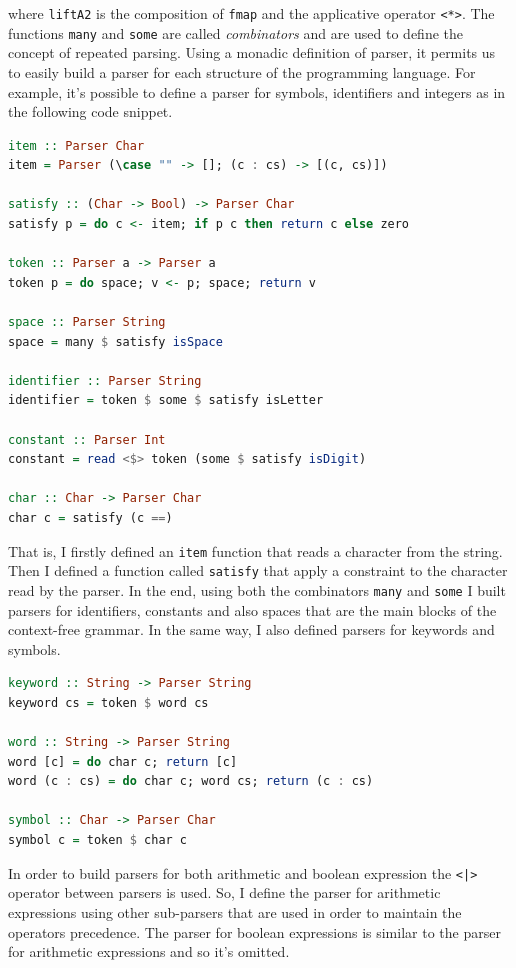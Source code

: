 \documentclass[12pt,a4paper]{article}
\begin{document}
where \texttt{liftA2} is the composition of \texttt{fmap} and the applicative operator \texttt{<*>}.
The functions \texttt{many} and \texttt{some} are called \textit{combinators} and are used to define the concept of repeated parsing.
Using a monadic definition of parser, it permits us to easily build a parser for each structure of the programming language.
For example, it's possible to define a parser for symbols, identifiers and integers as in the following code snippet.
\begin{lstlisting}[language=Haskell, style=custom-style]
item :: Parser Char
item = Parser (\case "" -> []; (c : cs) -> [(c, cs)])

satisfy :: (Char -> Bool) -> Parser Char
satisfy p = do c <- item; if p c then return c else zero

token :: Parser a -> Parser a
token p = do space; v <- p; space; return v

space :: Parser String
space = many $ satisfy isSpace

identifier :: Parser String
identifier = token $ some $ satisfy isLetter

constant :: Parser Int
constant = read <$> token (some $ satisfy isDigit)

char :: Char -> Parser Char
char c = satisfy (c ==)
\end{lstlisting}
That is, I firstly defined an \texttt{item} function that reads a character from the string.
Then I defined a function called \texttt{satisfy} that apply a constraint to the character read by the parser.
In the end, using both the combinators \texttt{many} and \texttt{some} I built parsers for identifiers, constants and also spaces that are the main blocks of the context-free grammar.
In the same way, I also defined parsers for keywords and symbols.
\begin{lstlisting}[language=Haskell, style=custom-style]
keyword :: String -> Parser String
keyword cs = token $ word cs

word :: String -> Parser String
word [c] = do char c; return [c]
word (c : cs) = do char c; word cs; return (c : cs)

symbol :: Char -> Parser Char
symbol c = token $ char c
\end{lstlisting}
In order to build parsers for both arithmetic and boolean expression the \texttt{<|>} operator between parsers is used.
So, I define the parser for arithmetic expressions using other sub-parsers that are used in order to maintain the operators precedence.
The parser for boolean expressions is similar to the parser for arithmetic expressions and so it's omitted.
\end{document}

